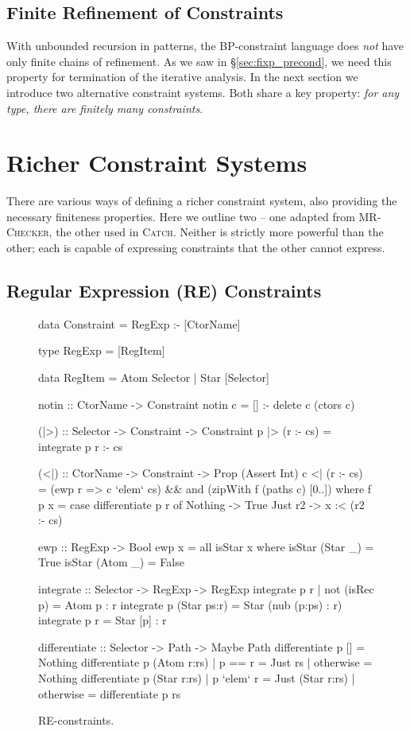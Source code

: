 \documentclass[preprint]{sigplanconf}
\newcommand{\catch}{\textsc{Catch}}
\newcommand{\newtool}{\anon{\catch07}{\catch}}
\newcommand{\oldtool}{\anon{\catch05}{\textsc{MR-Checker}}}
\newcommand{\anon}[2]{#2}
\begin{document}
\subsection{Finite Refinement of Constraints}
\label{sec:bounded}

With unbounded recursion in patterns, the BP-constraint language does \textit{not} have only finite chains of refinement. As we saw in \S\ref{sec:fixp_precond}, we need this property for termination of the iterative analysis. In the next section we introduce two alternative constraint systems. Both share a key property: \textit{for any type, there are finitely many constraints}.


\section{Richer Constraint Systems}
\label{sec:constraint}

There are various ways of defining a richer constraint system, also providing the necessary finiteness properties. Here we outline two -- one adapted from \oldtool{}, the other used in \newtool{}. Neither is strictly more powerful than the other; each is capable of expressing constraints that the other cannot express.

\subsection{Regular Expression (RE) Constraints}
\label{sec:regexp}

\begin{figure}
\begin{code}
data Constraint = RegExp :- [CtorName]

type RegExp = [RegItem]

data RegItem  =  Atom  Selector
              |  Star  [Selector]

notin :: CtorName -> Constraint
notin c = [] :- delete c (ctors c)

(|>) :: Selector -> Constraint -> Constraint
p |> (r :- cs) = integrate p r :- cs

(<|) :: CtorName -> Constraint -> Prop (Assert Int)
c <| (r :- cs) = (ewp r => c `elem` cs) &&
    and (zipWith f (paths c) [0..])
    where
    f p x = case  differentiate p r of
                  Nothing  -> True
                  Just r2  -> x :< (r2 :- cs)

ewp :: RegExp -> Bool
ewp x = all isStar x
   where  isStar (Star  _) = True
          isStar (Atom  _) = False

integrate :: Selector -> RegExp -> RegExp
integrate p r | not (isRec p)  = Atom p : r
integrate p (Star ps:r)        = Star (nub (p:ps) : r)
integrate p r                  = Star [p] : r

differentiate :: Selector -> Path -> Maybe Path
differentiate p [] = Nothing
differentiate p (Atom  r:rs)  | p == r     = Just rs
                              | otherwise  = Nothing
differentiate p (Star  r:rs)  | p `elem` r  = Just (Star r:rs)
                              | otherwise   = differentiate p rs
\end{code}
\caption{RE-constraints.}
\label{fig:regexp}
\end{figure}
\end{document}
